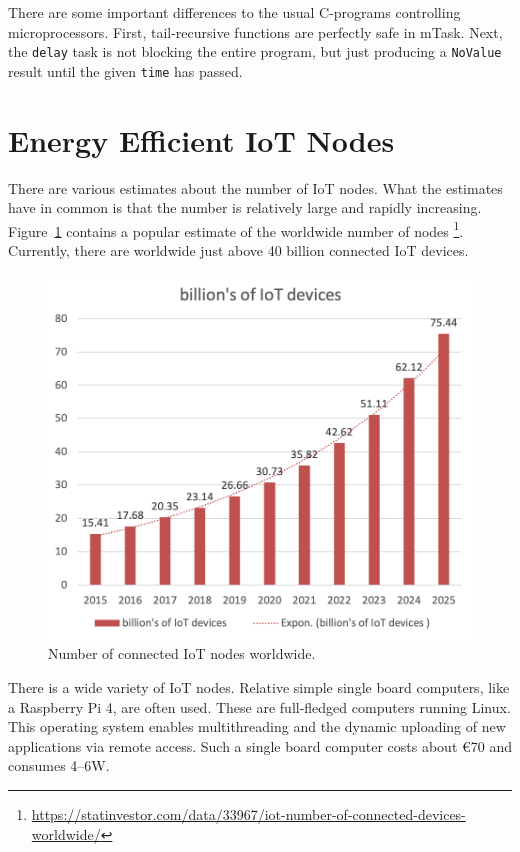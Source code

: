 \documentclass[runningheads]{llncs}
\newcommand{\CleanInline}[1]{\lstinline[language=Clean]!#1!}
\newcommand{\prog}[1]{\CleanInline{#1}}
\begin{document}
There are some important differences to the usual C-programs controlling microprocessors.
First, tail-recursive functions are perfectly safe in mTask.
Next, the \prog{delay} task is not blocking the entire program, but just producing a \prog{NoValue} result until the given \prog{time} has passed.

\section{Energy Efficient IoT Nodes}

There are various estimates about the number of IoT nodes.
What the estimates have in common is that the number is relatively large and rapidly increasing.
Figure~\ref{fig:iotNodes} contains a popular estimate of the worldwide number of nodes%
\footnote{\url{https://statinvestor.com/data/33967/iot-number-of-connected-devices-worldwide/}}.
Currently, there are worldwide just above 40 billion connected IoT devices.

\begin{figure}[ht]
	\centering
	\includegraphics[width=.6\linewidth]{iotNodes}
	\caption{Number of connected IoT nodes worldwide.}%
	\label{fig:iotNodes}
\end{figure}

There is a wide variety of IoT nodes.
Relative simple single board computers, like a Raspberry Pi 4, are often used.
These are full-fledged computers running Linux.
This operating system enables multithreading and the dynamic uploading of new applications via remote access.
Such a single board computer costs about \euro{70} and consumes 4--6W.
\end{document}
